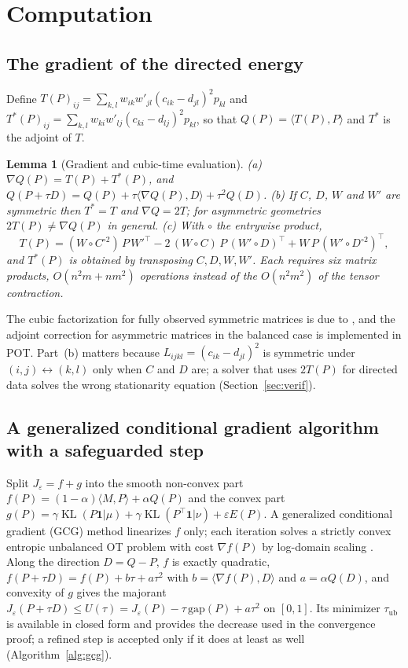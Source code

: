 \documentclass[12pt]{article}
\newtheorem{lemma}{Lemma}
\theoremstyle{definition}
\newcommand{\KL}{\operatorname{KL}}
\begin{document}
\section{Computation}
\label{sec:computation}

\subsection{The gradient of the directed energy}

Define $T(P)_{ij}=\sum_{k,l}w_{ik}w'_{jl}(c_{ik}-d_{jl})^2p_{kl}$ and $T^\ast(P)_{ij}=\sum_{k,l}w_{ki}w'_{lj}(c_{ki}-d_{lj})^2p_{kl}$, so that $Q(P)=\langle T(P),P\rangle$ and $T^\ast$ is the adjoint of $T$.

\begin{lemma}[Gradient and cubic-time evaluation]\label{lem:grad}
(a) $\nabla Q(P)=T(P)+T^\ast(P)$, and $Q(P+\tau D)=Q(P)+\tau\langle\nabla Q(P),D\rangle+\tau^2Q(D)$. (b) If $C$, $D$, $W$ and $W'$ are symmetric then $T^\ast=T$ and $\nabla Q=2T$; for asymmetric geometries $2T(P)\neq\nabla Q(P)$ in general. (c) With $\circ$ the entrywise product,
\[
T(P)=(W\circ C^{\circ2})\,P\,W'^\top-2\,(W\circ C)\,P\,(W'\circ D)^\top+W\,P\,(W'\circ D^{\circ2})^\top ,
\]
and $T^\ast(P)$ is obtained by transposing $C,D,W,W'$. Each requires six matrix products, $O(n^2m+nm^2)$ operations instead of the $O(n^2m^2)$ of the tensor contraction.
\end{lemma}

The cubic factorization for fully observed symmetric matrices is due to \citet{peyre2016gromov}, and the adjoint correction for asymmetric matrices in the balanced case is implemented in POT. Part~(b) matters because $L_{ijkl}=(c_{ik}-d_{jl})^2$ is symmetric under $(i,j)\leftrightarrow(k,l)$ only when $C$ and $D$ are; a solver that uses $2T(P)$ for directed data solves the wrong stationarity equation (Section~\ref{sec:verif}).

\subsection{A generalized conditional gradient algorithm with a safeguarded step}

Split $J_\varepsilon=f+g$ into the smooth non-convex part $f(P)=(1-\alpha)\langle M,P\rangle+\alpha Q(P)$ and the convex part $g(P)=\gamma\KL(P\mathbf1|\mu)+\gamma\KL(P^\top\mathbf1|\nu)+\varepsilon E(P)$. A generalized conditional gradient (GCG) method \citep{bredies2009generalized,rakotomamonjy2015generalized} linearizes $f$ only; each iteration solves a strictly convex entropic unbalanced OT problem with cost $\nabla f(P)$ by log-domain scaling \citep{chizat2018scaling}. Along the direction $D=Q-P$, $f$ is exactly quadratic, $f(P+\tau D)=f(P)+b\tau+a\tau^2$ with $b=\langle\nabla f(P),D\rangle$ and $a=\alpha Q(D)$, and convexity of $g$ gives the majorant $J_\varepsilon(P+\tau D)\le U(\tau)=J_\varepsilon(P)-\tau\,\mathrm{gap}(P)+a\tau^2$ on $[0,1]$. Its minimizer $\tau_{\mathrm{ub}}$ is available in closed form and provides the decrease used in the convergence proof; a refined step is accepted only if it does at least as well (Algorithm~\ref{alg:gcg}).
\end{document}
